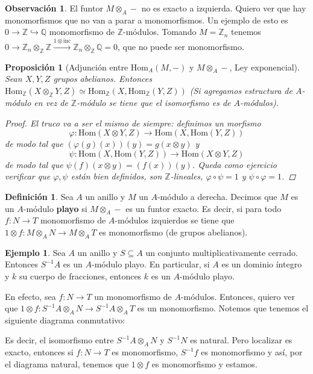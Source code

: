 \documentclass[12pt]{book}
\newtheorem{prop}[teo]{Proposición}
\theoremstyle{definition}
\newtheorem{obs}[teo]{Observación}
\newtheorem{defn}[teo]{Definición}
\newtheorem{ex}[teo]{Ejemplo}
\newcommand{\ZZ}{\mathbb{Z}}      %
\newcommand{\QQ}{\mathbb{Q}}
\renewcommand{\hom}{\mathrm{Hom}}
\begin{document}
\begin{obs}
El funtor $M\otimes_A -$ no es exacto a izquierda. Quiero ver que hay monomorfismos que no van a parar a monomorfismos. Un ejemplo de esto es $0\longrightarrow \ZZ\hookrightarrow \QQ$ monomorfismo de $\ZZ$-módulos. Tomando $M=\ZZ_n$ tenemos $0\longrightarrow \ZZ_n\otimes_\ZZ \ZZ \stackrel{1\otimes\mathrm{inc}}{\longrightarrow}\ZZ_n\otimes_{\ZZ}\QQ = 0$, que no puede ser monomorfismo.
\end{obs}

\begin{prop}[Adjunción entre $\hom_A(M,-)$ y $M\otimes_A -$, Ley exponencial]
Sean $X,Y,Z$ grupos abelianos. Entonces $\hom_\ZZ(X\otimes_\ZZ Y,Z)\simeq \hom_\ZZ(X,\hom_\ZZ(Y,Z))$ (Si agregamos estructura de $A$-módulo en vez de $\ZZ$-módulo se tiene que el isomorfismo es de $A$-módulos).
\begin{proof}
El truco va a ser el mismo de siempre: definimos un morfismo $$\varphi:\hom(X\otimes Y,Z)\to \hom(X,\hom(Y,Z))$$ de modo tal que $(\varphi(g)(x))(y) = g(x\otimes y)$ y $$\psi:\hom(X,\hom(Y,Z))\to \hom(X\otimes Y,Z)$$ de modo tal que $\psi(f)(x\otimes y) = (f(x))(y)$. Queda como ejercicio verificar que $\varphi,\psi$ están bien definidos, son $\ZZ$-lineales, $\varphi\circ\psi = 1$ y $\psi\circ\varphi=1$.
\end{proof}
\end{prop}

\begin{defn}
Sea $A$ un anillo y $M$ un $A$-módulo a derecha. Decimos que $M$ es un $A$-módulo \textbf{playo} si $M\otimes_A -$ es un funtor exacto. Es decir, si para todo $f:N\to T$ monomorfismo de $A$-módulos izquierdos se tiene que $1\otimes f:M\otimes_A N\to M\otimes_A T$ es monomorfismo (de grupos abelianos).
\end{defn}

\begin{ex}
Sea $A$ un anillo y $S\subseteq A$ un conjunto multiplicativamente cerrado. Entonces $S^{-1}A$ es un $A$-módulo playo. En particular, si $A$ es un dominio íntegro y $k$ su cuerpo de fracciones, entonces $k$ es un $A$-módulo playo.

En efecto, sea $f:N\to T$ un monomorfismo de $A$-módulos. Entonces, quiero ver que $1\otimes f:S^{-1}A\otimes_A N\to S^{-1}A\otimes_A T$ es un monomorfismo. Notemos que tenemos el siguiente diagrama conmutativo: \begin{center}\end{center}
Es decir, el isomorfismo entre $S^{-1}A\otimes_A N$ y $S^{-1}N$ es natural. Pero localizar es exacto, entonces si $f:N\to T$ es monomorfismo, $S^{-1}f$ es monomorfismo y así, por el diagrama natural, tenemos que $1\otimes f$ es monomorfismo y estamos.
\end{ex}
\end{document}
